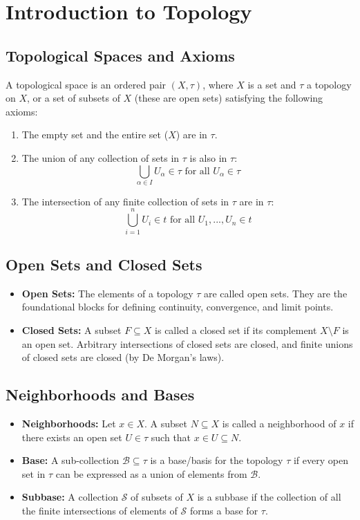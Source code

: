 \documentclass[10pt,a4paper]{article}
\begin{document}
	\section{Introduction to Topology}
		\subsection{Topological Spaces and Axioms}
		A topological space is an ordered pair $(X,\tau)$, where $X$ is a set and $\tau$ a topology on $X$, or a set of subsets of $X$ (these are open sets) satisfying the following axioms:
		\begin{enumerate}
			\item The empty set and the entire set ($X$) are in $\tau$.
			\item The union of any collection of sets in $\tau$ is also in $\tau$: $$\bigcup_{\alpha\in I}U_{\alpha}\in \tau\text{ for all }U_{\alpha}\in\tau$$
			\item The intersection of any finite collection of sets in $\tau$ are in $\tau$: $$\bigcup_{i=1}^n U_i\in t\text{ for all }U_1,...,U_n\in t$$
		\end{enumerate}
		\subsection{Open Sets and Closed Sets}
		\begin{itemize}
			\item \textbf{Open Sets:} The elements of a topology $\tau$ are called open sets. They are the foundational blocks for defining continuity, convergence, and limit points.
			\item \textbf{Closed Sets:} A subset $F\subseteq X$ is called a closed set if its complement $X\setminus F$ is an open set. Arbitrary intersections of closed sets are closed, and finite unions of closed sets are closed (by De Morgan's laws).
		\end{itemize}
		\subsection{Neighborhoods and Bases}
		\begin{itemize}
			\item \textbf{Neighborhoods:} Let $x \in X$. A subset $N\subseteq X$ is called a neighborhood of $x$ if there exists an open set $U\in \tau$ such that $x\in U\subseteq N$.
			\item \textbf{Base:} A sub-collection $\mathcal{B}\subseteq\tau$ is a base/basis for the topology $\tau$ if every open set in $\tau$ can be expressed as a union of elements from $\mathcal{B}$.
			\item \textbf{Subbase:} A collection $\mathcal{S}$ of subsets of $X$ is a subbase if the collection of all the finite intersections of elements of $\mathcal{S}$ forms a base for $\tau$.
		\end{itemize}
\end{document}
